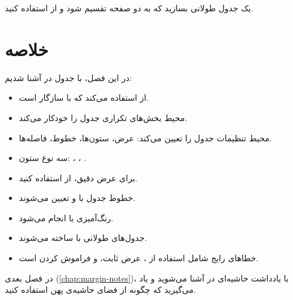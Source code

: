\begin{exercise}
    یک جدول طولانی بسازید که به دو صفحه
    تقسیم شود و از  استفاده کنید.
    \label{exc:tables-long}
\end{exercise}

\section{خلاصه}
\label{sec:tables-summary}

در این فصل، با جدول در  آشنا
شدیم:

\begin{itemize}
    \item {} از 
    استفاده می‌کند که با  سازگار
    است.

    \item محیط  بخش‌های تکراری
    جدول را خودکار می‌کند.

    \item محیط  تنظیمات جدول را تعیین
    می‌کند: عرض، ستون‌ها، خطوط، فاصله‌ها.

    \item سه نوع ستون: ، ، .

    \item برای عرض دقیق، از
     استفاده
    کنید.

    \item خطوط جدول با  و 
    تعیین می‌شوند.

    \item رنگ‌آمیزی با  انجام می‌شود.

    \item جدول‌های طولانی با  ساخته
    می‌شوند.

    \item خطاهای رایج شامل استفاده از
    ، عرض ثابت، و فراموش کردن
     است.
\end{itemize}

در فصل بعدی (\cref{chap:margin-notes})، با
یادداشت حاشیه‌ای در  آشنا
می‌شوید و یاد می‌گیرید که چگونه از فضای
حاشیه‌ی پهن استفاده کنید.